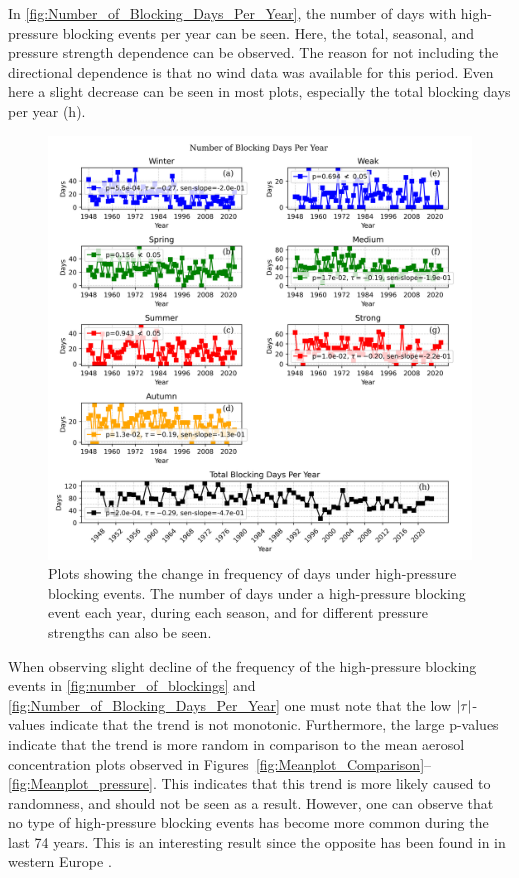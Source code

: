 In \autoref{fig:Number_of_Blocking_Days_Per_Year}, the number of days with high-pressure blocking events per year can be seen. Here, the total, seasonal, and pressure strength dependence can be observed. The reason for not including the directional dependence is that no wind data was available for this period. Even here a slight decrease can be seen in most plots, especially the total blocking days per year (h). 


\begin{figure}[H]
    \centering
    \includegraphics[width=\textwidth]{Figures/blocking_days_per_year_all.png}
    \caption{Plots showing the change in frequency of days under high-pressure blocking events. The number of days under a high-pressure blocking event each year, during each season, and for different pressure strengths can also be seen.}
    \label{fig:Number_of_Blocking_Days_Per_Year}
\end{figure}

When observing slight decline of the frequency of the high-pressure blocking events in \autoref{fig:number_of_blockings} and \autoref{fig:Number_of_Blocking_Days_Per_Year} one must note that the low $\left| \tau \right|$-values indicate that the trend is not monotonic. Furthermore, the large p-values indicate that the trend is more random in comparison to the mean aerosol concentration plots observed in Figures~\ref{fig:Meanplot_Comparison}--\ref{fig:Meanplot_pressure}. This indicates that this trend is more likely caused to randomness, and should not be seen as a result. However, one can observe that no type of high-pressure blocking events has become more common during the last 74 years. This is an interesting result since the opposite has been found in in western Europe \cite{lupoAtmosphericBlockingEvents2020}. 
